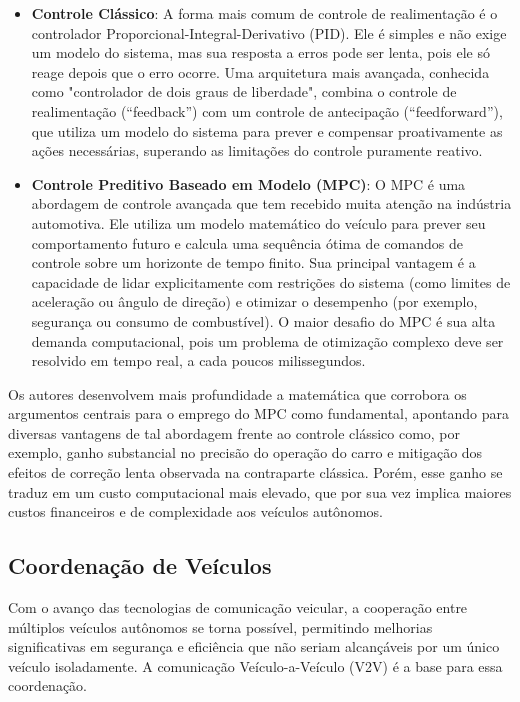 \begin{itemize}
    \item \textbf{Controle Clássico}: A forma mais comum de controle de realimentação é o controlador Proporcional-Integral-Derivativo (PID). Ele é simples e não exige um modelo do sistema, mas sua resposta a erros pode ser lenta, pois ele só reage depois que o erro ocorre. Uma arquitetura mais avançada, conhecida como "controlador de dois graus de liberdade", combina o controle de realimentação (``feedback'') com um controle de antecipação (``feedforward''), que utiliza um modelo do sistema para prever e compensar proativamente as ações necessárias, superando as limitações do controle puramente reativo.
    \item \textbf{Controle Preditivo Baseado em Modelo (MPC)}: O MPC é uma abordagem de controle avançada que tem recebido muita atenção na indústria automotiva. Ele utiliza um modelo matemático do veículo para prever seu comportamento futuro e calcula uma sequência ótima de comandos de controle sobre um horizonte de tempo finito. Sua principal vantagem é a capacidade de lidar explicitamente com restrições do sistema (como limites de aceleração ou ângulo de direção) e otimizar o desempenho (por exemplo, segurança ou consumo de combustível). O maior desafio do MPC é sua alta demanda computacional, pois um problema de otimização complexo deve ser resolvido em tempo real, a cada poucos milissegundos.
\end{itemize}

Os autores desenvolvem mais profundidade a matemática que corrobora os argumentos centrais para o emprego do MPC como fundamental, apontando para diversas vantagens de tal abordagem frente ao controle clássico como, por exemplo, ganho substancial no precisão do operação do carro e mitigação dos efeitos de correção lenta observada na contraparte clássica. Porém, esse ganho se traduz em um custo computacional mais elevado, que por sua vez implica maiores custos financeiros e de complexidade aos veículos autônomos.

\subsection{Coordenação de Veículos}

Com o avanço das tecnologias de comunicação veicular, a cooperação entre múltiplos veículos autônomos se torna possível, permitindo melhorias significativas em segurança e eficiência que não seriam alcançáveis por um único veículo isoladamente. A comunicação Veículo-a-Veículo (V2V) é a base para essa coordenação.

